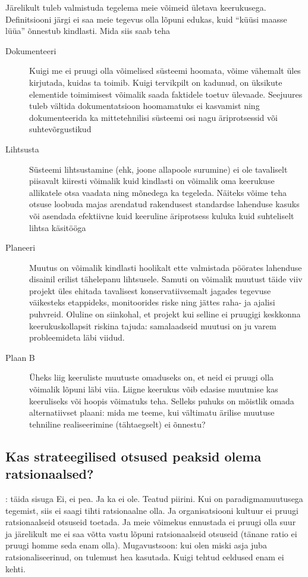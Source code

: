 Järelikult tuleb valmistuda tegelema meie võimeid ületava keerukusega. Definitsiooni järgi ei saa meie tegevus olla lõpuni edukas, kuid \enquote{küüsi maasse lüüa} õnnestub kindlasti. Mida siis saab teha 
\begin{description}
	\item[Dokumenteeri] Kuigi me ei pruugi olla võimelised süsteemi hoomata, võime vähemalt üles kirjutada, kuidas ta toimib. Kuigi tervikpilt on kadunud, on üksikute elementide toimimisest võimalik saada faktidele toetuv ülevaade. Seejuures tuleb vältida dokumentatsioon hoomamatuks ei kasvamist ning dokumenteerida ka mittetehnilisi süsteemi osi nagu äriprotsessid või suhtevõrgustikud
	\item[Lihtsusta] Süsteemi lihtsustamine (ehk, joone allapoole surumine) ei ole tavaliselt piisavalt kiiresti võimalik kuid kindlasti on võimalik oma keerukuse allikatele otsa vaadata ning mõnedega ka tegeleda. Näiteks võime teha otsuse loobuda majas arendatud rakendusest standardse lahenduse kasuks või asendada efektiivne kuid keeruline äriprotsess kuluka kuid suhteliselt lihtsa käsitööga
	\item[Planeeri] Muutus on võimalik kindlasti hoolikalt ette valmistada pöörates lahenduse disainil erilist tähelepanu lihtsusele. Samuti on võimalik muutust täide viiv projekt üles ehitada tavalisest konservatiivsemalt jagades tegevuse väikesteks etappideks, monitoorides riske ning jättes raha- ja ajalisi puhvreid. Oluline on siinkohal, et projekt kui selline ei pruugigi keskkonna keerukuskollapsit riskina tajuda: samalaadseid muutusi on ju varem probleemideta läbi viidud. 
	\item[Plaan B] Üheks liig keeruliste muutuste omaduseks on, et neid ei pruugi olla võimalik lõpuni läbi viia. Liigne keerukus võib edasise muutmise kas keeruliseks või hoopis võimatuks teha. Selleks puhuks on mõistlik omada alternatiivset plaani: mida me teeme, kui vältimatu ärilise muutuse tehniline realiseerimine (tähtaegselt) ei õnnestu?
\end{description}

\subsection{Kas strateegilised otsused peaksid olema ratsionaalsed?}
\TODO: täida sisuga
Ei, ei pea. Ja ka ei ole. Teatud piirini. Kui on paradigmamuutusega tegemist, siis ei saagi tihti ratsionaalne olla. Ja organisatsiooni kultuur ei pruugi ratsionaalseid otsuseid toetada. Ja meie võimekus ennustada ei pruugi olla suur ja järelikult me ei saa võtta vastu lõpuni ratsionaalseid otsuseid (tänane ratio ei pruugi homme seda enam olla). Mugavustsoon: kui olen miski asja juba ratsionaliseerinud, on tulemust hea kasutada. Kuigi tehtud eeldused enam ei kehti.

